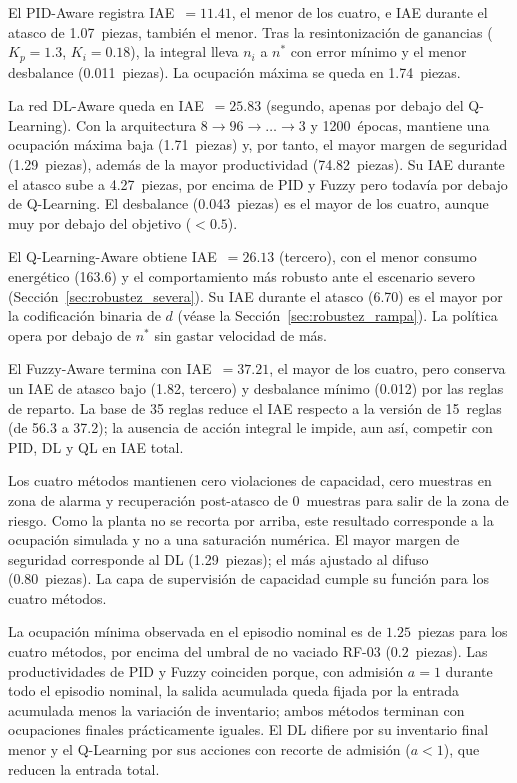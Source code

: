 El PID-Aware registra IAE~$=11.41$, el menor de los cuatro, e IAE durante el atasco de 1.07~piezas, también el menor. Tras la resintonización de ganancias ($K_p=1.3$, $K_i=0.18$), la integral lleva $n_i$ a $n^*$ con error mínimo y el menor desbalance (0.011~piezas). La ocupación máxima se queda en 1.74~piezas.

La red DL-Aware queda en IAE~$=25.83$ (segundo, apenas por debajo del Q-Learning). Con la arquitectura $8\!\to\!96\!\to\!\dots\!\to\!3$ y 1200~épocas, mantiene una ocupación máxima baja (1.71~piezas) y, por tanto, el mayor margen de seguridad (1.29~piezas), además de la mayor productividad (74.82~piezas). Su IAE durante el atasco sube a 4.27~piezas, por encima de PID y Fuzzy pero todavía por debajo de Q-Learning. El desbalance (0.043~piezas) es el mayor de los cuatro, aunque muy por debajo del objetivo ($<0.5$).

El Q-Learning-Aware obtiene IAE~$=26.13$ (tercero), con el menor consumo energético (163.6) y el comportamiento más robusto ante el escenario severo (Sección~\ref{sec:robustez_severa}). Su IAE durante el atasco (6.70) es el mayor por la codificación binaria de $d$ (véase la Sección~\ref{sec:robustez_rampa}). La política opera por debajo de $n^*$ sin gastar velocidad de más.

El Fuzzy-Aware termina con IAE~$=37.21$, el mayor de los cuatro, pero conserva un IAE de atasco bajo (1.82, tercero) y desbalance mínimo (0.012) por las reglas de reparto. La base de 35 reglas reduce el IAE respecto a la versión de 15~reglas (de 56.3 a 37.2); la ausencia de acción integral le impide, aun así, competir con PID, DL y QL en IAE total.

Los cuatro métodos mantienen cero violaciones de capacidad, cero muestras en zona de alarma y recuperación post-atasco de 0~muestras para salir de la zona de riesgo. Como la planta no se recorta por arriba, este resultado corresponde a la ocupación simulada y no a una saturación numérica. El mayor margen de seguridad corresponde al DL (1.29~piezas); el más ajustado al difuso (0.80~piezas). La capa de supervisión de capacidad cumple su función para los cuatro métodos.

La ocupación mínima observada en el episodio nominal es de $1.25$~piezas para los cuatro métodos, por encima del umbral de no vaciado RF-03 ($0.2$~piezas). Las productividades de PID y Fuzzy coinciden porque, con admisión $a=1$ durante todo el episodio nominal, la salida acumulada queda fijada por la entrada acumulada menos la variación de inventario; ambos métodos terminan con ocupaciones finales prácticamente iguales. El DL difiere por su inventario final menor y el Q-Learning por sus acciones con recorte de admisión ($a<1$), que reducen la entrada total.

